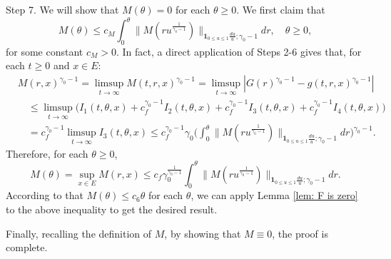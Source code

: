 \documentclass[12pt, a4paper]{amsart}
\theoremstyle{definition}
\numberwithin{equation}{section}
\begin{document}
	Step 7. We will show that $M(\theta) = 0$ for each $\theta \geq 0$.
	We first claim that
\[
	M(\theta)
	\leq c_M\int_0^\theta  \big\| M(r u^{\frac{1}{\gamma_0 - 1}}) \big\|_{\mathbf 1_{0\leq u\leq 1}\frac{du}{u};\gamma_0 - 1}  dr ,
	\quad \theta \geq 0,
\]
	for some constant $c_M > 0$.
	In fact, a direct application of Steps 2-6 gives that, for each $t\geq 0$ and $x\in E$:
\[\begin{split}
	&M(r,x)^{\gamma_0 - 1}
	=\limsup_{t\to \infty} M(t,r,x)^{\gamma_0 - 1}
	= \limsup_{t\to \infty}|G(r)^{\gamma_0 - 1} - g(t,r,x)^{\gamma_0 - 1}|
	\\&\quad \leq \limsup_{t\to \infty} \big( I_1(t,\theta,x) +c^{\gamma_0 - 1}_f I_2(t,\theta,x) +c^{\gamma_0 - 1}_f I_3(t,\theta,x) + c^{\gamma_0 - 1}_f I_4(t,\theta,x) \big)
	\\& \quad = c_f^{\gamma_0 - 1} \limsup_{t\to \infty} I_3(t,\theta ,x)
	\leq c_f^{\gamma_0 - 1} \gamma_0 \Big(  \int_0^\theta  \big\| M(r u^{\frac{1}{\gamma_0 - 1}}) \big\|_{\mathbf 1_{0\leq u\leq 1}\frac{du}{u};\gamma_0 - 1}  dr\Big)^{\gamma_0 - 1}.
\end{split}\]
	Therefore, for each $\theta \geq 0$,
\[
	M(\theta)
	= \sup_{x\in E}  M(r,x)
	\leq c_f \gamma_0^{\frac{1}{\gamma_0 - 1}} \int_0^\theta  \big\| M(r u^{\frac{1}{\gamma_0 - 1}}) \big\|_{\mathbf 1_{0\leq u\leq 1}\frac{du}{u};\gamma_0 - 1}  dr.
\]
	According to that $M(\theta) \leq c_6 \theta$ for each $\theta$, we can apply Lemma \ref{lem: F is zero} to the above inequality to get the desired result.
	
	Finally, recalling the definition of $M$, by showing that $M\equiv 0$, the proof is complete.
\end{document}
